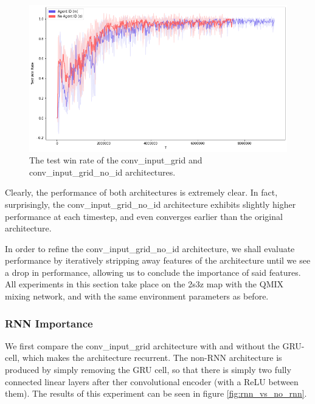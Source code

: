 \begin{figure}
    \centering
    \includegraphics[scale=0.3]{images/graphs/NoId/noid.png}
    \caption{The test win rate of the conv\_input\_grid and conv\_input\_grid\_no\_id architectures.}
    \label{fig:noid}
\end{figure}


Clearly, the performance of both architectures is extremely clear. In fact, surprisingly, the conv\_input\_grid\_no\_id architecture exhibits slightly higher performance at each timestep, and even converges earlier than the original architecture. 



In order to refine the conv\_input\_grid\_no\_id architecture, we shall evaluate performance by iteratively stripping away features of the architecture until we see a drop in performance, allowing us to conclude the importance of said features. All experiments in this section take place on the 2s3z map with the QMIX mixing network, and with the same environment parameters as before.

\subsubsection{RNN Importance}
We first compare the conv\_input\_grid architecture with and without the GRU-cell, which makes the architecture recurrent. The non-RNN architecture is produced by simply removing the GRU cell, so that there is simply two fully connected linear layers after ther convolutional encoder (with a ReLU between them). The results of this experiment can be seen in figure \ref{fig:rnn_vs_no_rnn}.


